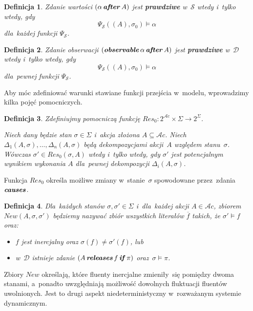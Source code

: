 \documentclass[11pt,a4paper]{article}
\newtheorem{defn}{Definicja}
\DeclareMathOperator{\After}{\textbf{\textit{after}}}
\DeclareMathOperator{\Observable}{\textbf{\textit{observable}}}
\DeclareMathOperator{\Causes}{\textbf{\textit{causes}}}
\DeclareMathOperator{\If}{\textbf{\textit{if}}}
\DeclareMathOperator{\Releases}{\textbf{\textit{releases}}}
\begin{document}
\begin{defn}
    Zdanie wartości $(\alpha \After A)$ jest \textbf{prawdziwe} w~$\mathcal{S}$ wtedy i~tylko wtedy, gdy
    $$\Psi_{\mathcal{S}}((A), \sigma_0) \models \alpha$$
    dla~każdej funkcji $\Psi_{\mathcal{S}}$.
\end{defn}

\begin{defn}
    Zdanie obserwacji $(\Observable \alpha \After A)$ jest \textbf{prawdziwe} w~$\mathcal{D}$ wtedy i~tylko wtedy, gdy
    $$\Psi_{\mathcal{S}}((A), \sigma_0) \models \alpha$$
    dla~pewnej funkcji $\Psi_{\mathcal{S}}$.
\end{defn}

Aby móc zdefiniować warunki stawiane funkcji przejścia w~modelu, wprowadzimy kilka pojęć pomocniczych.

\begin{defn}
    Zdefiniujmy pomocniczą funkcję $Res_0: 2^{\mathcal{A}c} \times \Sigma \rightarrow 2^\Sigma$.

    Niech dany będzie stan $\sigma \in \Sigma$ i~akcja złożona $A \subseteq \mathcal{A}c$.
    Niech $\Delta_1(A, \sigma), \dots, \Delta_n(A, \sigma)$ będą dekompozycjami akcji~$A$ względem stanu~$\sigma$.
    Wówczas $\sigma' \in Res_0(\sigma, A)$ wtedy i~tylko wtedy, gdy $\sigma'$ jest potencjalnym wynikiem wykonania $A$ dla~pewnej dekompozycji $\Delta_i(A, \sigma)$.
\end{defn}

Funkcja $Res_0$ określa możliwe zmiany w~stanie~$\sigma$ spowodowane przez~zdania $\Causes$.

\begin{defn}
    Dla~każdych stanów $\sigma, \sigma' \in \Sigma$ i~dla~każdej akcji $A \in \mathcal{A}c$, zbiorem $New(A, \sigma, \sigma')$ będziemy nazywać zbiór wszystkich literałów $\overline{f}$ takich, że $\sigma' \models f$ oraz:
    \begin{itemize}
        \item $f$ jest inercjalny oraz $\sigma(f) \neq \sigma'(f)$, lub
        \item w~$\mathcal{D}$ istnieje zdanie $(A \Releases f \If \pi)$ oraz~$\sigma \models \pi$.
    \end{itemize}
\end{defn}

Zbiory $New$ określają, które fluenty inercjalne zmieniły~się pomiędzy dwoma stanami, a~ponadto uwzględniają możliwość dowolnych fluktuacji fluentów uwolnionych.
Jest to drugi aspekt niedeterministyczny w~rozważanym systemie dynamicznym.
\end{document}
